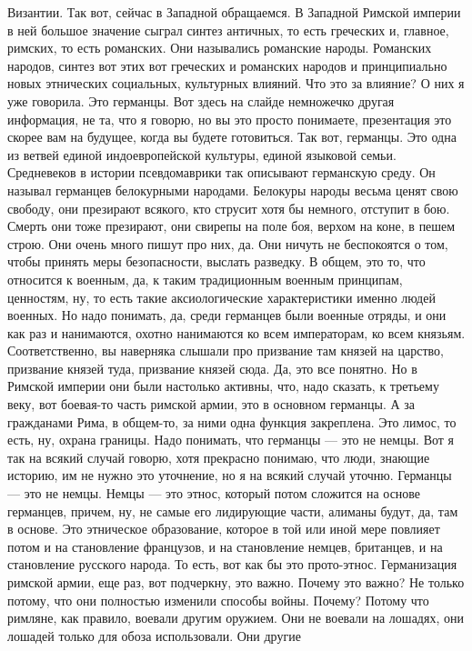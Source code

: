 Византии. Так вот, сейчас в Западной обращаемся. В Западной Римской империи в
ней большое значение сыграл синтез античных, то есть греческих и, главное,
римских, то есть романских. Они назывались романские народы. Романских народов,
синтез вот этих вот греческих и романских народов и принципиально новых
этнических социальных, культурных влияний. Что это за влияние? О них я уже
говорила. Это германцы. Вот здесь на слайде немножечко другая информация, не та,
что я говорю, но вы это просто понимаете, презентация это скорее вам на будущее,
когда вы будете готовиться. Так вот, германцы. Это одна из ветвей единой
индоевропейской культуры, единой языковой семьи. Средневеков в истории
псевдомаврики так описывают германскую среду. Он называл германцев белокурными
народами. Белокуры народы весьма ценят свою свободу, они презирают всякого, кто
струсит хотя бы немного, отступит в бою. Смерть они тоже презирают, они свирепы
на поле боя, верхом на коне, в пешем строю. Они очень много пишут про них, да.
Они ничуть не беспокоятся о том, чтобы принять меры безопасности, выслать
разведку. В общем, это то, что относится к военным, да, к таким традиционным
военным принципам, ценностям, ну, то есть такие аксиологические характеристики
именно людей военных. Но надо понимать, да, среди германцев были военные отряды,
и они как раз и нанимаются, охотно нанимаются ко всем императорам, ко всем
князьям. Соответственно, вы наверняка слышали про призвание там князей на
царство, призвание князей туда, призвание князей сюда. Да, это все понятно. Но в
Римской империи они были настолько активны, что, надо сказать, к третьему веку,
вот боевая-то часть римской армии, это в основном германцы. А за гражданами
Рима, в общем-то, за ними одна функция закреплена. Это лимос, то есть, ну,
охрана границы. Надо понимать, что германцы — это не немцы. Вот я так на всякий
случай говорю, хотя прекрасно понимаю, что люди, знающие историю, им не нужно
это уточнение, но я на всякий случай уточню. Германцы — это не немцы. Немцы —
это этнос, который потом сложится на основе германцев, причем, ну, не самые его
лидирующие части, алиманы будут, да, там в основе. Это этническое образование,
которое в той или иной мере повлияет потом и на становление французов, и на
становление немцев, британцев, и на становление русского народа. То есть, вот
как бы это прото-этнос. Германизация римской армии, еще раз, вот подчеркну, это
важно. Почему это важно? Не только потому, что они полностью изменили способы
войны. Почему? Потому что римляне, как правило, воевали другим оружием. Они не
воевали на лошадях, они лошадей только для обоза использовали. Они другие
